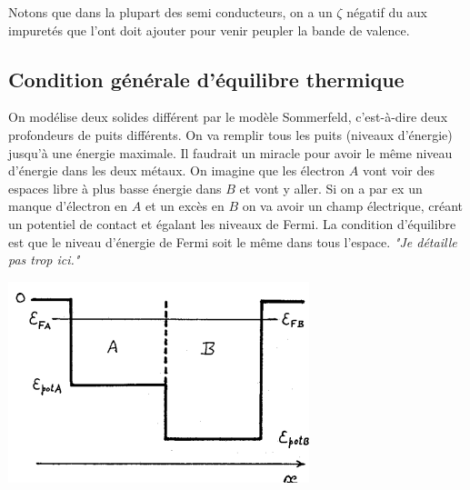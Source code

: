 Notons que dans la plupart des semi conducteurs, on a un $\zeta$ négatif du 
aux impuretés que l'ont doit ajouter pour venir peupler la bande de valence.



\subsection{Condition générale d'équilibre thermique}
On modélise deux solides différent par le modèle Sommerfeld, c'est-à-dire 
deux profondeurs de puits différents. On va remplir tous les puits (niveaux 
d'énergie) jusqu'à une énergie maximale. Il faudrait un miracle pour avoir 
le même niveau d'énergie dans les deux métaux. On imagine que les électron 
$A$ vont voir des espaces libre à plus basse énergie dans $B$ et vont y aller. 
Si on a par ex un manque d'électron en $A$ et un excès en $B$ on va avoir un 
champ électrique, créant un potentiel de contact et égalant les niveaux de 
Fermi. La condition d'équilibre est que le niveau d'énergie de Fermi soit le 
même dans tous l'espace. \textit{"Je détaille pas trop ici."} 

\begin{center}
	\includegraphics[scale=0.6]{ch1/image3.png}
\end{center}
